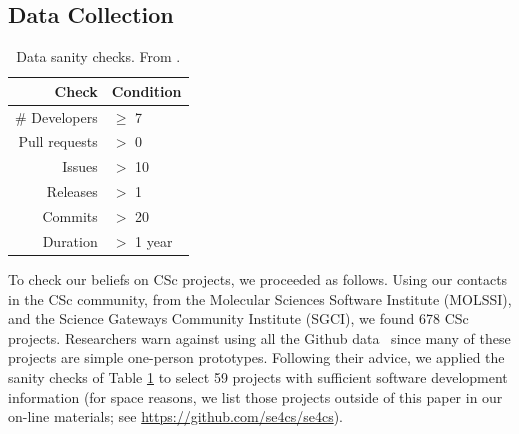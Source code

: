 \documentclass[conference,10pt]{IEEEtran}
\begin{document}
 

 
 
\subsection{Data Collection}\label{tion:data}

\begin{table}
\vspace{-15pt}
\centering
\caption{Data sanity checks. From \cite{Kalliamvakou:2014}.}\label{tbl:sanity}
\small
 
 \begin{tabular}{r|l}
 Check   & Condition    \\\hline
 \# Developers & $\geq$ 7 \\
 Pull requests  & $>$ 0 \\
Issues & $>$ 10 \\
Releases &  $>$ 1 \\
Commits & $>$ 20 \\
Duration  & $>$ 1 year 
\end{tabular}%
\vspace{-10pt}
\end{table}
To check our beliefs on CSc projects, we proceeded as follows. 
Using our contacts in the CSc community, from the Molecular Sciences Software Institute (MOLSSI), and the Science Gateways Community Institute (SGCI), we found
678 CSc  projects.
Researchers
warn against using all the Github data~\cite{bird09promise,agrawal2018we, eirini15promise, munaiah17curating} since
many of these projects are simple one-person prototypes.
Following  their advice, we applied the sanity checks of Table \ref{tbl:sanity}
to select 59  projects with sufficient software development information
(for space reasons, we list those projects outside of this paper in our on-line materials; see \url{https://github.com/se4cs/se4cs}).
 
\end{document}
